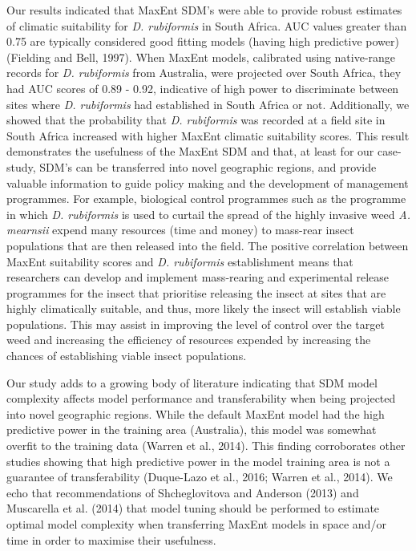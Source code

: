 \documentclass[12pt,]{article}
\begin{document}
Our results indicated that MaxEnt SDM's were able to provide robust
estimates of climatic suitability for \emph{D. rubiformis} in South
Africa. AUC values greater than 0.75 are typically considered good
fitting models (having high predictive power) (Fielding and Bell, 1997).
When MaxEnt models, calibrated using native-range records for \emph{D.
rubiformis} from Australia, were projected over South Africa, they had
AUC scores of 0.89 - 0.92, indicative of high power to discriminate
between sites where \emph{D. rubiformis} had established in South Africa
or not. Additionally, we showed that the probability that \emph{D.
rubiformis} was recorded at a field site in South Africa increased with
higher MaxEnt climatic suitability scores. This result demonstrates the
usefulness of the MaxEnt SDM and that, at least for our case-study,
SDM's can be transferred into novel geographic regions, and provide
valuable information to guide policy making and the development of
management programmes. For example, biological control programmes such
as the programme in which \emph{D. rubiformis} is used to curtail the
spread of the highly invasive weed \emph{A. mearnsii} expend many
resources (time and money) to mass-rear insect populations that are then
released into the field. The positive correlation between MaxEnt
suitability scores and \emph{D. rubiformis} establishment means that
researchers can develop and implement mass-rearing and experimental
release programmes for the insect that prioritise releasing the insect
at sites that are highly climatically suitable, and thus, more likely
the insect will establish viable populations. This may assist in
improving the level of control over the target weed and increasing the
efficiency of resources expended by increasing the chances of
establishing viable insect populations.

Our study adds to a growing body of literature indicating that SDM model
complexity affects model performance and transferability when being
projected into novel geographic regions. While the default MaxEnt model
had the high predictive power in the training area (Australia), this
model was somewhat overfit to the training data (Warren et al., 2014).
This finding corroborates other studies showing that high predictive
power in the model training area is not a guarantee of transferability
(Duque-Lazo et al., 2016; Warren et al., 2014). We echo that
recommendations of Shcheglovitova and Anderson (2013) and Muscarella et
al. (2014) that model tuning should be performed to estimate optimal
model complexity when transferring MaxEnt models in space and/or time in
order to maximise their usefulness.
\end{document}
